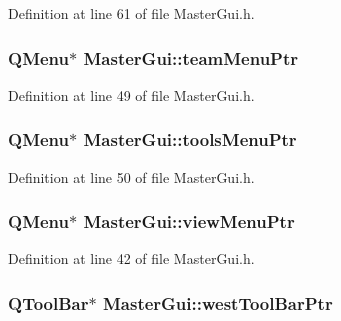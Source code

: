 Definition at line 61 of file Master\-Gui.\-h.

\hypertarget{class_master_gui_ad1d5b1e487d4695bab91ab0db856d795}{
\subsubsection[{team\-Menu\-Ptr}]{\setlength{\rightskip}{0pt plus 5cm}Q\-Menu$\ast$ Master\-Gui\-::team\-Menu\-Ptr\hspace{0.3cm}{\ttfamily [private]}}}\label{class_master_gui_ad1d5b1e487d4695bab91ab0db856d795}


Definition at line 49 of file Master\-Gui.\-h.

\hypertarget{class_master_gui_ab751e75ffdf91f5b90b4c2900975f308}{
\subsubsection[{tools\-Menu\-Ptr}]{\setlength{\rightskip}{0pt plus 5cm}Q\-Menu$\ast$ Master\-Gui\-::tools\-Menu\-Ptr\hspace{0.3cm}{\ttfamily [private]}}}\label{class_master_gui_ab751e75ffdf91f5b90b4c2900975f308}


Definition at line 50 of file Master\-Gui.\-h.

\hypertarget{class_master_gui_acb6a42ddb59a05f60ab7aa2a9fdddbc8}{
\subsubsection[{view\-Menu\-Ptr}]{\setlength{\rightskip}{0pt plus 5cm}Q\-Menu$\ast$ Master\-Gui\-::view\-Menu\-Ptr\hspace{0.3cm}{\ttfamily [private]}}}\label{class_master_gui_acb6a42ddb59a05f60ab7aa2a9fdddbc8}


Definition at line 42 of file Master\-Gui.\-h.

\hypertarget{class_master_gui_ad8bf561c56063077e97f9a993fa38ee4}{
\subsubsection[{west\-Tool\-Bar\-Ptr}]{\setlength{\rightskip}{0pt plus 5cm}Q\-Tool\-Bar$\ast$ Master\-Gui\-::west\-Tool\-Bar\-Ptr\hspace{0.3cm}{\ttfamily [private]}}}\label{class_master_gui_ad8bf561c56063077e97f9a993fa38ee4}


